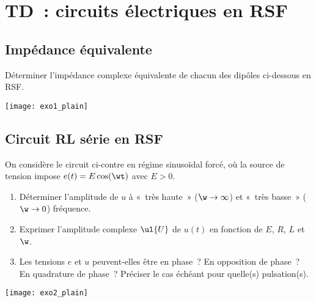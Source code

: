 \documentclass[a4paper, 12pt, final, garamond]{book}
\begin{document}
\setcounter{chapter}{4}

\chapter{TD~: circuits \'electriques en RSF}

\section{Impédance équivalente}
Déterminer l’impédance complexe équivalente de chacun des dipôles ci-dessous en RSF.
\begin{center}
    \texttt{[image: exo1\_plain]}
\end{center}

\section{Circuit RL série en RSF}
On considère le circuit ci-contre en régime sinusoïdal forcé, où la source de
tension impose $e(t) = E\cos(\wt)$ avec $E > 0$.

\begin{minipage}{0.60\linewidth}
    \begin{enumerate}
        \item Déterminer l'amplitude de $u$ à «~très haute~» ($\w\rightarrow\infty$)
            et «~très basse~» ($\w\rightarrow0$) fréquence.
        \item Exprimer l'amplitude complexe $\ul{U}$ de $u(t)$ en fonction de $E$,
            $R$, $L$ et $\w$.
        \item Les tensions $e$ et $u$ peuvent-elles être en phase~? En opposition de
            phase~? En quadrature de phase~? Préciser le cas échéant pour quelle(s)
            pulsation(s).
    \end{enumerate}
\end{minipage}
\hfill
\begin{minipage}{0.35\linewidth}
    \begin{center}
        \texttt{[image: exo2\_plain]}
    \end{center}
\end{minipage}
\end{document}
